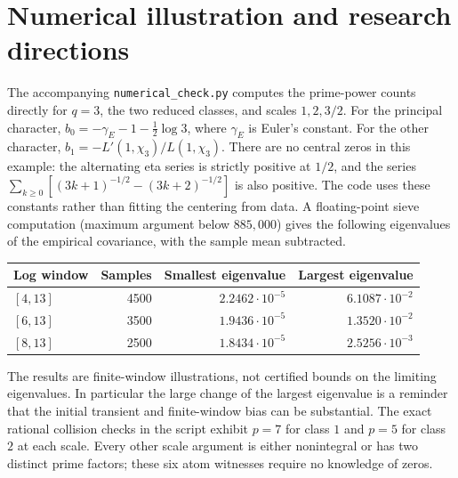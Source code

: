 \documentclass[11pt]{article}
\theoremstyle{remark}\newtheorem{remark}[theorem]{Remark}
\begin{document}
\section{Numerical illustration and research directions}
The accompanying \texttt{numerical\_check.py} computes the prime-power counts directly for $q=3$, the two reduced classes, and scales $1,2,3/2$. For the principal character, $b_0=-\gamma_E-1-\tfrac12\log3$, where $\gamma_E$ is Euler's constant. For the other character, $b_1=-L'(1,\chi_3)/L(1,\chi_3)$. There are no central zeros in this example: the alternating eta series is strictly positive at $1/2$, and the series $\sum_{k\ge0}[(3k+1)^{-1/2}-(3k+2)^{-1/2}]$ is also positive. The code uses these constants rather than fitting the centering from data. A floating-point sieve computation (maximum argument below $885{,}000$) gives the following eigenvalues of the empirical covariance, with the sample mean subtracted.
\begin{center}
\begin{tabular}{@{}lrrr@{}}
\toprule
Log window & Samples & Smallest eigenvalue & Largest eigenvalue\\
\midrule
$[4,13]$ & 4500 & $2.2462\cdot10^{-5}$ & $6.1087\cdot10^{-2}$\\
$[6,13]$ & 3500 & $1.9436\cdot10^{-5}$ & $1.3520\cdot10^{-2}$\\
$[8,13]$ & 2500 & $1.8434\cdot10^{-5}$ & $2.5256\cdot10^{-3}$\\
\bottomrule
\end{tabular}
\end{center}
The results are finite-window illustrations, not certified bounds on the limiting eigenvalues. In particular the large change of the largest eigenvalue is a reminder that the initial transient and finite-window bias can be substantial. The exact rational collision checks in the script exhibit $p=7$ for class $1$ and $p=5$ for class $2$ at each scale. Every other scale argument is either nonintegral or has two distinct prime factors; these six atom witnesses require no knowledge of zeros.
\end{document}
